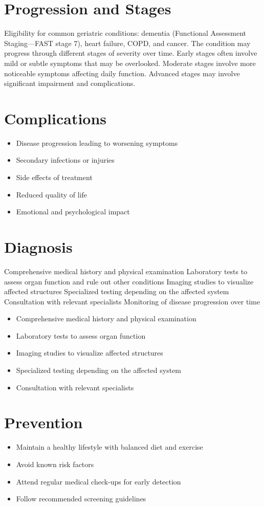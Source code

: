 \section{Progression and Stages}
Eligibility for common geriatric conditions: dementia (Functional Assessment Staging---FAST stage 7), heart failure, COPD, and cancer. The condition may progress through different stages of severity over time. Early stages often involve mild or subtle symptoms that may be overlooked. Moderate stages involve more noticeable symptoms affecting daily function. Advanced stages may involve significant impairment and complications.
\section{Complications}
\begin{itemize}[noitemsep]
  \item Disease progression leading to worsening symptoms
  \item Secondary infections or injuries
  \item Side effects of treatment
  \item Reduced quality of life
  \item Emotional and psychological impact
\end{itemize}
\section{Diagnosis}
Comprehensive medical history and physical examination Laboratory tests to assess organ function and rule out other conditions Imaging studies to visualize affected structures Specialized testing depending on the affected system Consultation with relevant specialists Monitoring of disease progression over time

\begin{itemize}[noitemsep]
  \item Comprehensive medical history and physical examination
  \item Laboratory tests to assess organ function
  \item Imaging studies to visualize affected structures
  \item Specialized testing depending on the affected system
  \item Consultation with relevant specialists
\end{itemize}
\section{Prevention}
\begin{itemize}[noitemsep]
  \item Maintain a healthy lifestyle with balanced diet and exercise
  \item Avoid known risk factors
  \item Attend regular medical check-ups for early detection
  \item Follow recommended screening guidelines
\end{itemize}
